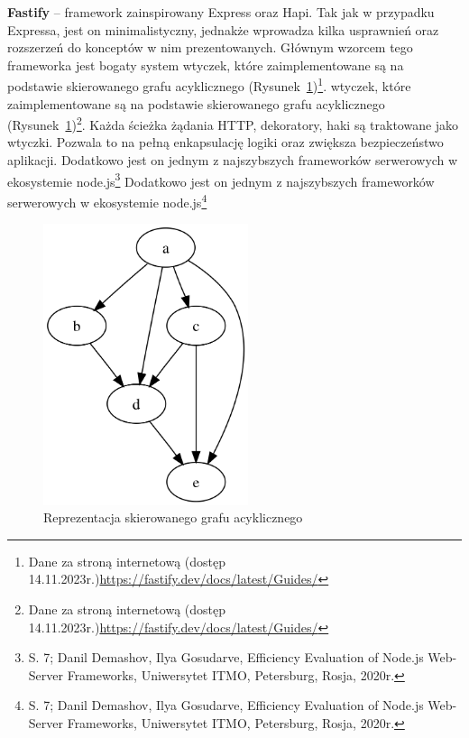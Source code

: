 \documentclass[12pt, a4paper, twoside, openany]{book}
\begin{document}
\textbf{Fastify} -- framework zainspirowany Express oraz Hapi. Tak jak w przypadku Expressa,
jest on minimalistyczny, jednakże wprowadza kilka usprawnień oraz rozszerzeń do
konceptów w nim prezentowanych. Głównym wzorcem tego frameworka jest bogaty system
wtyczek, które zaimplementowane są na podstawie skierowanego grafu acyklicznego (Rysunek~\ref{fig:ADG})\footnote{Dane za stroną internetową (dostęp 14.11.2023r.)\url{https://fastify.dev/docs/latest/Guides/}}.
wtyczek, które zaimplementowane są na podstawie skierowanego grafu acyklicznego (Rysunek~\ref{fig:ADG})\footnote{Dane za stroną internetową (dostęp 14.11.2023r.)\url{https://fastify.dev/docs/latest/Guides/}}.
Każda ścieżka żądania HTTP, dekoratory, haki są traktowane jako wtyczki.
Pozwala to na pełną enkapsulację logiki oraz zwiększa bezpieczeństwo aplikacji.
Dodatkowo jest on jednym z najszybszych frameworków serwerowych w ekosystemie node.js\footnote{S. 7; Danil Demashov, Ilya Gosudarve, Efficiency Evaluation of Node.js Web-Server Frameworks, Uniwersytet ITMO, Petersburg, Rosja, 2020r.}
Dodatkowo jest on jednym z najszybszych frameworków serwerowych w ekosystemie node.js\footnote{S. 7; Danil Demashov, Ilya Gosudarve, Efficiency Evaluation of Node.js Web-Server Frameworks, Uniwersytet ITMO, Petersburg, Rosja, 2020r.}

\begin{figure}[h]
    \includegraphics[width=6cm]{./static/ADG.png}
    \centering
    \caption{Reprezentacja skierowanego grafu acyklicznego}
    \label{fig:ADG}
\end{figure}
\end{document}
